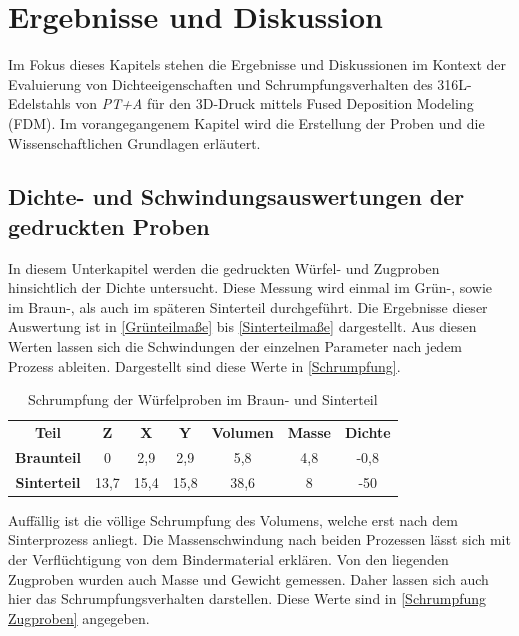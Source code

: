 \chapter{Ergebnisse und Diskussion}

Im Fokus dieses Kapitels stehen die Ergebnisse und Diskussionen im Kontext der Evaluierung von Dichteeigenschaften und Schrumpfungsverhalten des 316L-Edelstahls von \textit{PT+A} für den 3D-Druck mittels Fused Deposition Modeling (FDM). Im vorangegangenem Kapitel wird die Erstellung der Proben und die Wissenschaftlichen Grundlagen erläutert.

\section{Dichte- und Schwindungsauswertungen der gedruckten Proben}

In diesem Unterkapitel werden die gedruckten Würfel- und Zugproben hinsichtlich der Dichte untersucht. Diese Messung wird einmal im Grün-, sowie im Braun-, als auch im späteren Sinterteil durchgeführt. Die Ergebnisse dieser Auswertung ist in \autoref{Grünteilmaße} bis \autoref{Sinterteilmaße} dargestellt.
Aus diesen Werten lassen sich die Schwindungen der einzelnen Parameter nach jedem Prozess ableiten. Dargestellt sind diese Werte in \autoref{Schrumpfung}.

\begin{table}[h]
    \centering
    \caption{Schrumpfung der Würfelproben im Braun- und Sinterteil}
      \begin{tabular}{ccccccc}
      \toprule
      \textbf{Teil} & \multicolumn{1}{c}{\textbf{Z}} & \multicolumn{1}{c}{\textbf{X}} & \multicolumn{1}{c}{\textbf{Y}} & \multicolumn{1}{c}{\textbf{Volumen}} & \multicolumn{1}{c}{\textbf{Masse}} & \multicolumn{1}{c}{\textbf{Dichte}} \\
        \textbf{Braunteil} & 0 & 2,9 & 2,9 & 5,8 & 4,8 & -0,8 \\
        \textbf{Sinterteil} & 13,7 & 15,4 & 15,8 & 38,6 & 8 & -50 \\
      \bottomrule
      \end{tabular}%
    \label{Schrumpfung}%
  \end{table}%
  \FloatBarrier

Auffällig ist die völlige Schrumpfung des Volumens, welche erst nach dem Sinterprozess anliegt. Die Massenschwindung nach beiden Prozessen lässt sich mit der Verflüchtigung von dem Bindermaterial erklären. 
Von den liegenden Zugproben wurden auch Masse und Gewicht gemessen. Daher lassen sich auch hier das Schrumpfungsverhalten darstellen. Diese Werte sind in \autoref{Schrumpfung Zugproben} angegeben.


